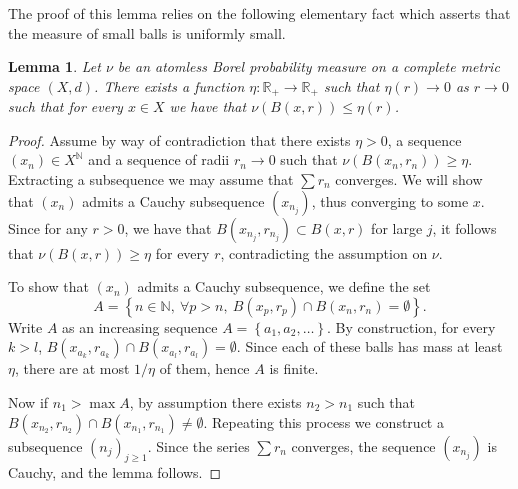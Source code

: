 \documentclass[11pt]{article}
\newtheorem{lemm}[theo]{Lemma}
\theoremstyle{definition}
\numberwithin{equation}{section}
\numberwithin{figure}{section}
\numberwithin{table}{section}
\newcommand{\nn}{\mathbb{N}}
\newcommand{\R}{{\mathbb R}}
\newcommand{\cv}{\rightarrow}
\newcommand{\set}[1]{\left\{#1\right\}}
\let\oldforall\forall
\renewcommand*{\forall}{\mathrel{\oldforall}}
\begin{document}
The proof of this lemma relies on the following elementary fact which asserts that the measure of small balls is uniformly small.

\begin{lemm}\label{lem:uniform}
Let $\nu$ be an atomless Borel probability measure on a complete metric space $(X,d)$. There exists a function $\eta : \R_+ \to \R_+$ such that $\eta(r)\to 0$ as $r\to 0$ such that for every $x\in X$ we have that $\nu(B(x,r))\leq \eta(r)$.
\end{lemm}

\goodbreak
\begin{proof}
Assume by way of contradiction that there exists $\eta>0$, a sequence $(x_n)\in X^\nn$ and a sequence of radii $r_n\cv 0$ such that $\nu(B(x_n, r_n))\geq \eta$. Extracting a subsequence we may assume that $\sum r_n$ converges. We will show that $(x_n)$ admits a Cauchy subsequence $(x_{n_j})$, thus converging to some $x$. Since for any $r>0$, we have that $B(x_{n_j}, r_{n_j}) \subset B(x, r)$ for large $j$, it follows that $\nu (B(x,r))\geq \eta$ for every $r$, contradicting the assumption on $\nu$.

To show that $(x_n)$ admits a Cauchy subsequence, we define the set
\[
A = \set{n\in \nn,\ \forall p>n, \ B(x_p, r_p) \cap B(x_n, r_n) = \emptyset}.
\]
Write $A$ as an increasing sequence $A = \set{a_1, a_2, \ldots}$. By construction, for every $k>l$, $B(x_{a_k}, r_{a_k}) \cap B(x_{a_l}, r_{a_l}) = \emptyset$. Since each of these balls has mass at least $ \eta$, there are at most $1/\eta$ of them, hence $A$ is finite.

Now if $n_1> \max A$, by assumption there exists $n_2>n_1$ such that $B(x_{n_2}, r_{n_2})\cap B(x_{n_1}, r_{n_1})\neq \emptyset$. Repeating this process we construct a subsequence $(n_j)_{j\geq 1}$. Since the series $\sum r_n$ converges, the sequence $(x_{n_j})$ is Cauchy, and the lemma follows.
\end{proof}
\end{document}
